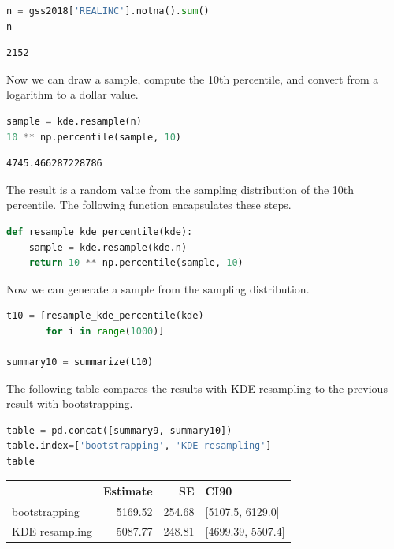\begin{lstlisting}[language=Python]
n = gss2018['REALINC'].notna().sum()
n
\end{lstlisting}

\begin{lstlisting}[]
2152
\end{lstlisting}

Now we can draw a sample, compute the 10th percentile, and convert from
a logarithm to a dollar value.

\begin{lstlisting}[language=Python]
sample = kde.resample(n)
10 ** np.percentile(sample, 10)
\end{lstlisting}

\begin{lstlisting}[]
4745.466287228786
\end{lstlisting}

The result is a random value from the sampling distribution of the 10th
percentile. The following function encapsulates these steps.

\begin{lstlisting}[language=Python]
def resample_kde_percentile(kde):
    sample = kde.resample(kde.n)
    return 10 ** np.percentile(sample, 10)
\end{lstlisting}

Now we can generate a sample from the sampling distribution.

\begin{lstlisting}[language=Python]
t10 = [resample_kde_percentile(kde)
       for i in range(1000)]

summary10 = summarize(t10)
\end{lstlisting}

The following table compares the results with KDE resampling to the
previous result with bootstrapping.

\begin{lstlisting}[language=Python]
table = pd.concat([summary9, summary10])
table.index=['bootstrapping', 'KDE resampling']
table
\end{lstlisting}

\begin{tabular}{lrrl}
\toprule
{} &  Estimate &      SE &               CI90 \\
\midrule
bootstrapping  &   5169.52 &  254.68 &   [5107.5, 6129.0] \\
KDE resampling &   5087.77 &  248.81 &  [4699.39, 5507.4] \\
\bottomrule
\end{tabular}

